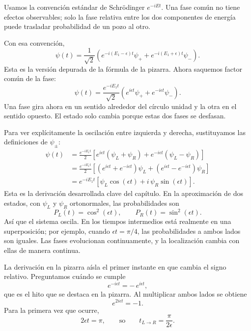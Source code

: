 Usamos la convención estándar de Schr\"odinger \(e^{-iEt}\). Una fase común no tiene efectos observables; solo la fase relativa entre los dos componentes de energía puede trasladar probabilidad de un pozo al otro.

Con esa convención,
\begin{equation}
\psi(t)=\frac{1}{\sqrt{2}}\left(e^{-i(E_1-\epsilon)t}\psi_+ + e^{-i(E_1+\epsilon)t}\psi_-\right).
\end{equation}
Esta es la versión depurada de la fórmula de la pizarra. Ahora saquemos factor común de la fase:
\begin{equation}
\psi(t)=\frac{e^{-iE_1 t}}{\sqrt{2}}\left(e^{i\epsilon t}\psi_+ + e^{-i\epsilon t}\psi_-\right).
\end{equation}
Una fase gira ahora en un sentido alrededor del círculo unidad y la otra en el sentido opuesto. El estado solo cambia porque estas dos fases se desfasan.

Para ver explícitamente la oscilación entre izquierda y derecha, sustituyamos las definiciones de \(\psi_\pm\):
\begin{align}
\psi(t)
&= \frac{e^{-iE_1 t}}{2}
\left[e^{i\epsilon t}(\psi_L+\psi_R)+e^{-i\epsilon t}(\psi_L-\psi_R)\right] \\
&= \frac{e^{-iE_1 t}}{2}
\left[(e^{i\epsilon t}+e^{-i\epsilon t})\psi_L+(e^{i\epsilon t}-e^{-i\epsilon t})\psi_R\right] \\
&= e^{-iE_1 t}\left[\psi_L\cos(\epsilon t)+i\,\psi_R\sin(\epsilon t)\right].
\end{align}
Esta es la derivación desarrollada clave del capítulo. En la aproximación de dos estados, con \(\psi_L\) y \(\psi_R\) ortonormales, las probabilidades son
\begin{equation}
P_L(t)=\cos^2(\epsilon t),
\qquad
P_R(t)=\sin^2(\epsilon t).
\end{equation}
Así que el sistema oscila. En los tiempos intermedios está realmente en una superposición; por ejemplo, cuando \(\epsilon t=\pi/4\), las probabilidades a ambos lados son iguales. Las fases evolucionan continuamente, y la localización cambia con ellas de manera continua.

La derivación en la pizarra aísla el primer instante en que cambia el signo relativo. Preguntamos cuándo se cumple
\begin{equation}
e^{-i\epsilon t}=-\,e^{i\epsilon t},
\end{equation}
que es el hito que se destaca en la pizarra. Al multiplicar ambos lados se obtiene
\begin{equation}
e^{2i\epsilon t}=-1.
\end{equation}
Para la primera vez que ocurre,
\begin{equation}
2\epsilon t=\pi,
\qquad\text{so}\qquad
t_{L\to R}=\frac{\pi}{2\epsilon}.
\end{equation}

